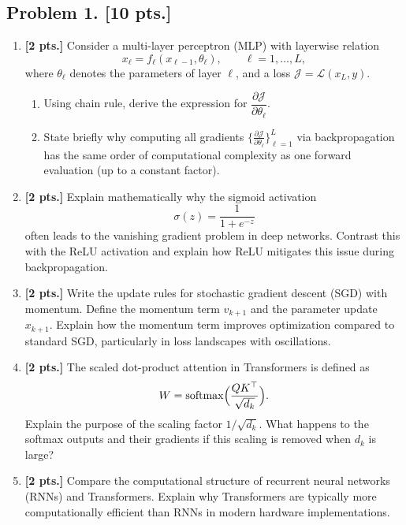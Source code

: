 \documentclass[11pt,a4paper]{article}
\DeclareMathOperator{\softmax}{softmax}
\begin{document}
\subsection{Problem 1. [10 pts.]}
\begin{enumerate}[label=(\alph*)]
    \item \textbf{[2 pts.]} Consider a multi-layer perceptron (MLP) with layerwise relation
    \[
    x_{\ell} = f_{\ell}(x_{\ell-1}, \theta_{\ell}), \qquad \ell = 1, \dots, L,
    \]
    where $\theta_{\ell}$ denotes the parameters of layer $\ell$, and a loss $\mathcal{J} = \mathcal{L}(x_L, y)$.
    \begin{enumerate}[label=(\roman*)]
        \item Using chain rule, derive the expression for $\dfrac{\partial \mathcal{J}}{\partial \theta_{\ell}}$.
        \item State briefly why computing all gradients $\bigl\{\frac{\partial \mathcal{J}}{\partial \theta_{\ell}}\bigr\}_{\ell=1}^{L}$ via backpropagation has the same order of computational complexity as one forward evaluation (up to a constant factor).
    \end{enumerate}
    \item \textbf{[2 pts.]} Explain mathematically why the sigmoid activation
    \[
    \sigma(z) = \frac{1}{1 + e^{-z}}
    \]
    often leads to the vanishing gradient problem in deep networks. Contrast this with the ReLU activation and explain how ReLU mitigates this issue during backpropagation.
    \item \textbf{[2 pts.]} Write the update rules for stochastic gradient descent (SGD) with momentum. Define the momentum term $v_{k+1}$ and the parameter update $x_{k+1}$. Explain how the momentum term improves optimization compared to standard SGD, particularly in loss landscapes with oscillations.
    \item \textbf{[2 pts.]} The scaled dot-product attention in Transformers is defined as
    \[
    W = \softmax\Bigl(\frac{Q K^{\top}}{\sqrt{d_k}}\Bigr).
    \]
    Explain the purpose of the scaling factor $1/\sqrt{d_k}$. What happens to the softmax outputs and their gradients if this scaling is removed when $d_k$ is large?
    \item \textbf{[2 pts.]} Compare the computational structure of recurrent neural networks (RNNs) and Transformers. Explain why Transformers are typically more computationally efficient than RNNs in modern hardware implementations.
\end{enumerate}
\end{document}
